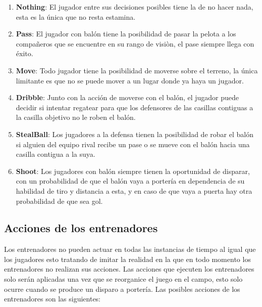 \documentclass{article}
\begin{document}
\begin{enumerate}
      \item \textbf{Nothing}: El jugador entre sus decisiones posibles tiene la de no hacer nada, esta es la única que no resta estamina.
            
      \item \textbf{Pass}: El jugador con balón tiene la posibilidad de pasar la pelota a los compañeros que se encuentre en su rango de visiòn, el pase siempre llega con éxito.
            
      \item \textbf{Move}: Todo jugador tiene la posibilidad de moverse sobre el terreno, la única limitante es que no se puede mover a un lugar donde ya haya un jugador.
            
      \item \textbf{Dribble}: Junto con la acción de moverse con el balón, el jugador puede decidir si intentar regatear para que los defensores de las casillas contiguas a la casilla objetivo no le roben el balón.
            
      \item \textbf{StealBall}: Los jugadores a la defensa tienen la posibilidad de robar el balón si alguien del equipo rival recibe un pase  o se mueve con el balón hacia una casilla contigua a la suya.
            
      \item \textbf{Shoot}: Los jugadores con balón siempre tienen la oportunidad de disparar, con un probabilidad de que el balón vaya a portería en dependencia de su habilidad de tiro y distancia a esta, y en caso de que vaya a puerta hay otra probabilidad de que sea gol.
            
\end{enumerate}


\subsection{Acciones de los entrenadores}

Los entrenadores no pueden actuar en todas las instancias de tiempo al igual que los jugadores esto tratando de imitar la realidad
en la que en todo momento los entrenadores no realizan sus acciones. Las acciones que ejecuten los entrenadores solo
serán aplicadas una vez que se reorganice el juego en el campo, esto solo ocurre cuando se produce un disparo a portería.
Las posibles acciones de los entrenadores son las siguientes:
\end{document}
